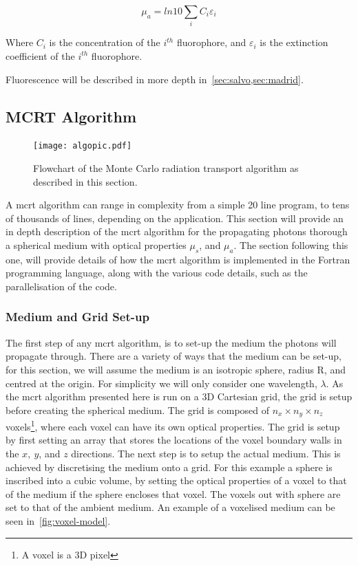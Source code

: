 \begin{equation}
\mu_a=ln10 \sum_i C_i \varepsilon_i
\label{eqn:exct}	
\end{equation}

Where $C_i$ is the concentration of the $i^{th}$ fluorophore, and $\varepsilon_i$ is the extinction coefficient of the $i^{th}$ fluorophore.

Fluorescence will be described in more depth in~\cref{sec:salvo,sec:madrid}.
\newpage
\subsection{MCRT Algorithm}\label{sec:algorithmMCRT}

\begin{figure}
\centering
\texttt{[image: algopic.pdf]}
\caption{Flowchart of the Monte Carlo radiation transport algorithm as described in this section.}
\label{fig:algo}
\vspace{-80pt}
\end{figure}
\leavevmode
\FloatBarrier

A \gls*{mcrt} algorithm can range in complexity from a simple 20 line program, to tens of thousands of lines, depending on the application. This section will provide an in depth description of the \gls*{mcrt} algorithm for the propagating photons thorough a spherical medium with optical properties $\mu_s$, and $\mu_a$. The section following this one, will provide details of how the \gls*{mcrt} algorithm is implemented in the Fortran programming language, along with the various code details, such as the parallelisation of the code.


\subsubsection*{Medium and Grid Set-up}\label{sec:algomedium}
The first step of any \gls*{mcrt} algorithm, is to set-up the medium the photons will propagate through. There are a variety of ways that the medium can be set-up, for this section, we will assume the medium is an isotropic sphere, radius R, and centred at the origin. For simplicity we will only consider one wavelength, $\lambda$. As the \gls*{mcrt} algorithm presented here is run on a 3D Cartesian grid, the grid is setup before creating the spherical medium. The grid is composed of $n_x \times n_y \times n_z$ voxels\footnote{A voxel is a 3D pixel}, where each voxel can have its own optical properties.
The grid is setup by first setting an array that stores the locations of the voxel boundary walls in the $x,\ y$, and $z$ directions. 
The next step is to setup the actual medium. This is achieved by discretising the medium onto a grid. 
For this example a sphere is inscribed into a cubic volume, by setting the optical properties of a voxel to that of the medium if the sphere encloses that voxel. The voxels out with sphere are set to that of the ambient medium. An example of a voxelised medium can be seen in~\cref{fig:voxel-model}. 



